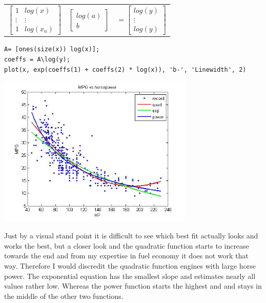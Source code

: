 \documentclass{article}
\begin{document}
\begin{enumerate}
\begin{mdframed}[style=MyFrame]
\begin{enumerate}
\begin{tabular}{p{3cm} p{1.5cm} p{1.5cm}}
\begin{equation*}
\begin{bmatrix}
1 & log(x)\\
\vdots & \vdots \\
1 & log(x_n)
\end{bmatrix}
\end{equation*}
&
\begin{equation*}
\begin{bmatrix}
log(a)\\
b
\end{bmatrix}
\end{equation*}
&

\begin{equation*}
=\begin{bmatrix}
log(y)\\
\vdots \\
log(y)
\end{bmatrix}
\end{equation*}

\end{tabular}
\begin{verbatim}
A= [ones(size(x)) log(x)];
coeffs = A\log(y);
plot(x, exp(coeffs(1) + coeffs(2) * log(x)), 'b-', 'Linewidth', 2)
\end{verbatim}

\begin{center}
\includegraphics[width=0.7\textwidth]{a4q11.jpg}\\
\end{center}
  Just by a visual stand point it is difficult to see which best fit actually looks and works the best, but a closer look and the quadratic function starts to increase towards the end and from my expertise in fuel economy it does not work that way. Therefore I would discredit the quadratic function engines with large horse power. The exponential equation has the smallest slope and estimates nearly all values rather low. Whereas the power function starts the highest and and stays in the middle of the other two functions.
\end{enumerate}
\end{mdframed}


\end{enumerate}
\end{document}
